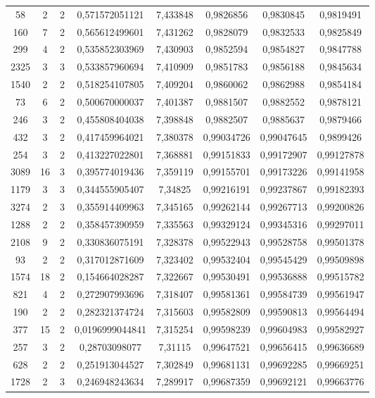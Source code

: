 \begin{longtable}{|c|c|c|c|c|c|c|c|}
58 & 2 & 2 & 0,571572051121 & 7,433848 & 0,9826856 & 0,9830845 & 0,9819491 \\
160 & 7 & 2 & 0,565612499601 & 7,431262 & 0,9828079 & 0,9832533 & 0,9825849 \\
299 & 4 & 2 & 0,535852303969 & 7,430903 & 0,9852594 & 0,9854827 & 0,9847788 \\
2325 & 3 & 3 & 0,533857960694 & 7,410909 & 0,9851783 & 0,9856188 & 0,9845634 \\
1540 & 2 & 2 & 0,518254107805 & 7,409204 & 0,9860062 & 0,9862988 & 0,9854184 \\
73 & 6 & 2 & 0,500670000037 & 7,401387 & 0,9881507 & 0,9882552 & 0,9878121 \\
246 & 3 & 2 & 0,455808404038 & 7,398848 & 0,9882507 & 0,9885637 & 0,9879466 \\
432 & 3 & 2 & 0,417459964021 & 7,380378 & 0,99034726 & 0,99047645 & 0,9899426 \\
254 & 3 & 2 & 0,413227022801 & 7,368881 & 0,99151833 & 0,99172907 & 0,99127878 \\
3089 & 16 & 3 & 0,395774019436 & 7,359119 & 0,99155701 & 0,99173226 & 0,99141958 \\
1179 & 3 & 3 & 0,344555905407 & 7,34825 & 0,99216191 & 0,99237867 & 0,99182393 \\
3274 & 2 & 3 & 0,355914409963 & 7,345165 & 0,99262144 & 0,99267713 & 0,99200826 \\
1288 & 2 & 2 & 0,358457390959 & 7,335563 & 0,99329124 & 0,99345316 & 0,99297011 \\
2108 & 9 & 2 & 0,330836075191 & 7,328378 & 0,99522943 & 0,99528758 & 0,99501378 \\
93 & 2 & 2 & 0,317012871609 & 7,323402 & 0,99532404 & 0,99545429 & 0,99509898 \\
1574 & 18 & 2 & 0,154664028287 & 7,322667 & 0,99530491 & 0,99536888 & 0,99515782 \\
821 & 4 & 2 & 0,272907993696 & 7,318407 & 0,99581361 & 0,99584739 & 0,99561947 \\
190 & 2 & 2 & 0,282321374724 & 7,315603 & 0,99582809 & 0,99590813 & 0,99564494 \\
377 & 15 & 2 & 0,0196999044841 & 7,315254 & 0,99598239 & 0,99604983 & 0,99582927 \\
257 & 3 & 2 & 0,28703098077 & 7,31115 & 0,99647521 & 0,99656415 & 0,99636689 \\
628 & 2 & 2 & 0,251913044527 & 7,302849 & 0,99681131 & 0,99692285 & 0,99669251 \\
1728 & 2 & 3 & 0,246948243634 & 7,289917 & 0,99687359 & 0,99692121 & 0,99663776 \\

\end{longtable}
